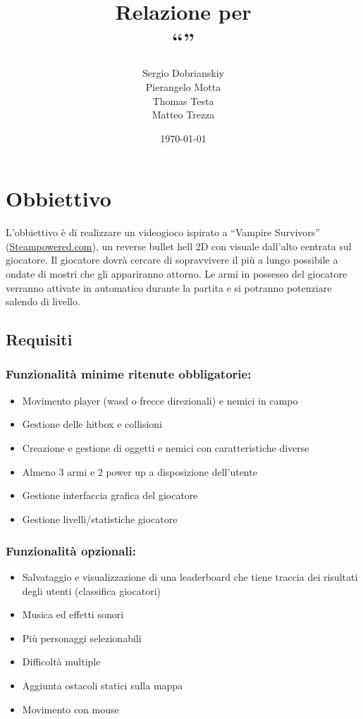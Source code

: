\documentclass[a4paper,12pt]{report}
\title{Relazione per\\``\gametitle''}
\author{
    Sergio Dobrianskiy
    \\
    Pierangelo Motta
    \\
    Thomas Testa
	\\
    Matteo Trezza
}
\date{\today}
\begin{document}
\maketitle
%
\tableofcontents
%
\chapter{Obbiettivo}
L'obbiettivo è di realizzare un videogioco ispirato a “Vampire Survivors” (\href{https://store.steampowered.com/app/1794680/Vampire_Survivors/}{Steampowered.com}), un reverse bullet hell 2D con visuale dall'alto centrata sul giocatore.
Il giocatore dovrà cercare di sopravvivere il più a lungo possibile a ondate di mostri che gli appariranno attorno. Le armi in possesso del giocatore verranno attivate in automatico durante la partita e si potranno potenziare salendo di livello.

\section{Requisiti}

\subsection*{Funzionalità minime ritenute obbligatorie:}

\begin{itemize}
	\item Movimento player (wasd o frecce direzionali) e nemici in campo
	\item Gestione delle hitbox e collisioni
	\item Creazione e gestione di oggetti e nemici con caratteristiche diverse 
	\item Almeno 3 armi e 2 power up a disposizione dell'utente
	\item Gestione interfaccia grafica del giocatore
	\item Gestione livelli/statistiche giocatore
\end{itemize}

\paragraph{}
\subsection*{Funzionalità opzionali:}
\begin{itemize}
	\item Salvataggio e visualizzazione di una leaderboard che tiene traccia dei risultati degli utenti (classifica giocatori)
	\item Musica ed effetti sonori
	\item Più personaggi selezionabili
	\item Difficoltà multiple
	\item Aggiunta ostacoli statici sulla mappa
	\item Movimento con mouse
\end{itemize}
%
\end{document}
